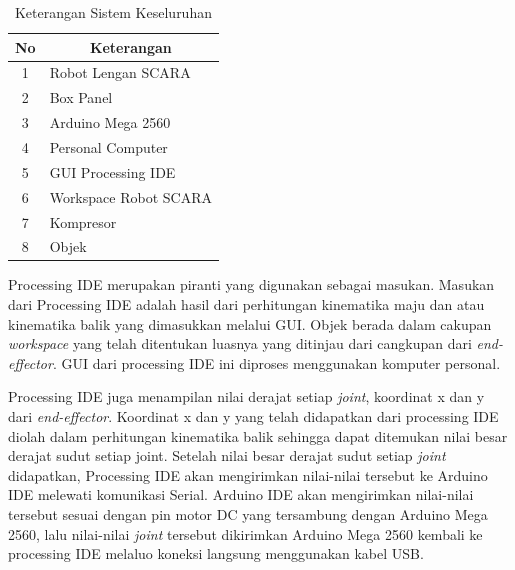 \begin{table}[H]
	\centering
	\caption{Keterangan Sistem Keseluruhan}

		\begin{tabular}{|c|l|}
			\hline
			\rowcolor[HTML]{9B9B9B} 
			No & \multicolumn{1}{c|}{\cellcolor[HTML]{9B9B9B}Keterangan} \\ \hline
			1  & Robot Lengan SCARA                                      \\ \hline
			2  & Box Panel                                               \\ \hline
			3  & Arduino Mega 2560                                       \\ \hline
			4  & Personal Computer                                       \\ \hline
			5  & GUI Processing IDE                                      \\ \hline
			6  & Workspace Robot SCARA                                   \\ \hline
			7  & Kompresor                                               \\ \hline
			8  & Objek                                                   \\ \hline
		\end{tabular}

\end{table}
Processing IDE merupakan piranti yang digunakan sebagai masukan. Masukan dari Processing IDE adalah hasil dari perhitungan kinematika maju dan atau kinematika balik yang dimasukkan melalui GUI. Objek berada dalam cakupan \textit{workspace} yang telah ditentukan luasnya yang ditinjau dari cangkupan dari \textit{end-effector}. GUI dari processing IDE ini diproses menggunakan komputer personal.  

Processing IDE juga menampilan nilai derajat setiap \textit{joint}, koordinat x dan y dari \textit{end-effector}. Koordinat x dan y yang telah didapatkan dari processing IDE diolah dalam perhitungan kinematika balik sehingga dapat ditemukan nilai besar derajat sudut setiap joint. Setelah nilai besar derajat sudut setiap \textit{joint} didapatkan, Processing IDE akan mengirimkan nilai-nilai tersebut ke Arduino IDE melewati komunikasi Serial. Arduino IDE akan mengirimkan nilai-nilai tersebut sesuai dengan pin motor DC yang tersambung dengan Arduino Mega 2560, lalu nilai-nilai \textit{joint}  tersebut dikirimkan Arduino Mega 2560 kembali ke processing IDE melaluo koneksi langsung menggunakan kabel USB.  

